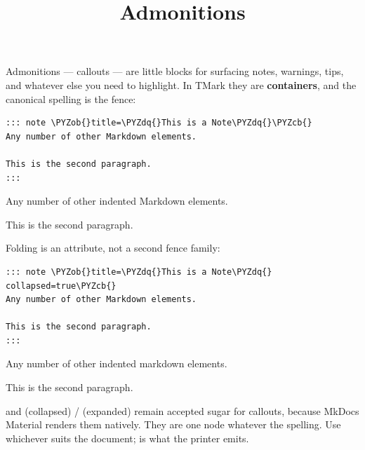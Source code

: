 \documentclass[a4paper,twoside]{article}
\title{Admonitions}
\author{}\date{}
\begin{document}
\maketitle
Admonitions --- callouts --- are little blocks for surfacing notes, warnings, tips,
and whatever else you need to highlight. In TMark they are \textbf{containers}, and
the canonical spelling is the \tscodeinline{:::} fence:
\begin{tscode}[lang=md, engine=pygments]
\begin{Verbatim}[commandchars=\\\{\},breaklines, breakanywhere, commandchars=\\\{\}]
::: note \PYZob{}title=\PYZdq{}This is a Note\PYZdq{}\PYZcb{}
Any number of other Markdown elements.

This is the second paragraph.
:::
\end{Verbatim}
\end{tscode}
\begin{tscallout}[kind=note, title={This is a Note}]
Any number of other indented Markdown elements.

This is the second paragraph.
\end{tscallout}
Folding is an attribute, not a second fence family:
\begin{tscode}[lang=md, engine=pygments]
\begin{Verbatim}[commandchars=\\\{\},breaklines, breakanywhere, commandchars=\\\{\}]
::: note \PYZob{}title=\PYZdq{}This is a Note\PYZdq{} collapsed=true\PYZcb{}
Any number of other Markdown elements.

This is the second paragraph.
:::
\end{Verbatim}
\end{tscode}
\begin{tscallout}[kind=note, title={This is a Note}, collapsed]
Any number of other indented markdown elements.

This is the second paragraph.
\end{tscallout}
\begin{tscallout}[kind=info, title={The PyMdownX spellings are kept indefinitely}]
 and  (collapsed) /  (expanded)
remain accepted sugar for callouts, because MkDocs Material renders them
natively. They are one node whatever the spelling. Use whichever suits the
document; \tscodeinline{:::} is what the printer emits.
\end{tscallout}
\end{document}
